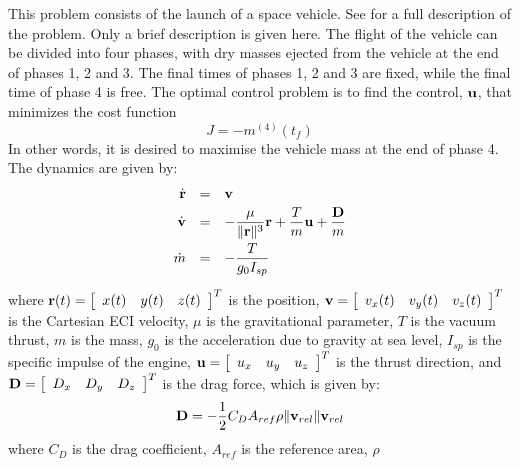 \documentclass[a4paper,11pt]{report}    %
\begin{document}
This problem consists of the launch of a space vehicle. See \cite{Rao:08, Benson:04} for a full description of the problem.
Only a brief description is given here. The flight of the vehicle can be divided into  four phases, with dry masses ejected from the 
vehicle at the end of phases 1, 2 and 3. The final times of phases 1, 2 and 3 are fixed,
while the final time of phase 4 is free. The optimal control problem is to find the control, ${\bf u}$,
that minimizes the cost function
\begin{equation}
  J=-m^{(4)}(t_f)
\end{equation}
In other words, it is desired to maximise the vehicle mass at the end of phase 4.
The dynamics are given by:
\begin{equation}\label{dyncs}
\begin{array}{rcl}
  \dot{\textbf{r}} &=& {\bf v} \vspace{3pt}\\
  \dot{\textbf{v}} &=& -\displaystyle\frac{\mu}{\|\textbf{r}\|^3}{\bf r} +
  \displaystyle\frac{T}{m}{\bf u} + \displaystyle\frac{{\bf D}}{m}  \vspace{3pt}\\
  \dot{m} & = & -\displaystyle\frac{T}{g_0I_{sp}}
\vspace{3pt}\\
\end{array}
\end{equation}
where ${\bf r}(t)=\left[\begin{array}{ccc} x(t) & y(t) & z(t)\end{array}\right]^T$
is the position, ${\bf v} = \left[\begin{array}{ccc} v_x(t) & v_y(t) & v_z(t)\end{array}\right]^T$
is the Cartesian ECI velocity, $\mu$ is the gravitational parameter, $T$ is
the vacuum thrust, $m$ is the mass, $g_0$ is the acceleration due to gravity at sea level,
$I_{sp}$ is the specific impulse of the engine,
${\bf u} = \left[\begin{array}{ccc} u_x & u_y & u_z \end{array}\right]^T$ is the thrust
direction, and ${\bf D}=\left[\begin{array}{ccc} D_x & D_y & D_z \end{array}\right]^T$
is the drag force, which is given by:
\begin{equation}
  {\bf D} = -\frac{1}{2}C_D A_{ref}\rho \|{\bf v}_{rel}\|{\bf v}_{rel}
\end{equation}
where $C_D$ is the drag coefficient, $A_{ref}$ is the reference area, $\rho$
\end{document}

